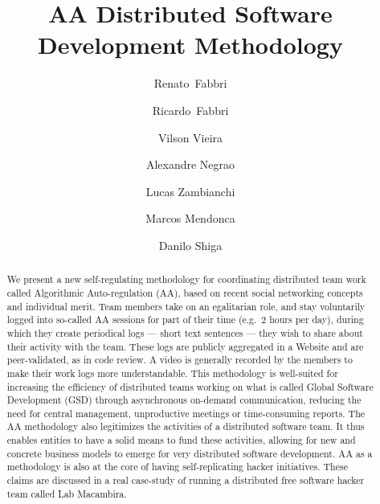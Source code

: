 \title{
AA Distributed Software Development Methodology
}

\author{%
Renato~Fabbri \and Ricardo~Fabbri \and Vilson Vieira \and Alexandre Negrao \and Lucas Zambianchi
\and Marcos Mendonca \and Danilo Shiga
}

\maketitle

\begin{abstract}
We present a new self-regulating methodology for coordinating
distributed team work called Algorithmic Auto-regulation (AA), based
on recent social networking concepts and individual merit. Team
members take on an egalitarian role, and stay voluntarily logged into
so-called AA sessions for part of their time (e.g.\ 2 hours per day),
during which they create periodical logs --- short text sentences ---
they wish to share about their activity with the team. These logs are
publicly aggregated in a Website and are peer-validated, as in code
review. A video is generally recorded by the members to make their
work logs more understandable. This methodology is well-suited for
increasing the efficiency of distributed teams working on what is
called Global Software Development (GSD) through asynchronous
on-demand communication, reducing the need for central management,
unproductive meetings or time-consuming reports. The AA methodology
also legitimizes the activities of a distributed software team.  It
thus enables entities to have a solid means to fund these activities,
allowing for new and concrete business models to emerge for very
distributed software development. AA as a methodology is also at the
core of having self-replicating hacker initiatives. These claims are
discussed in a real case-study of running a distributed free software
hacker team called Lab Macambira.
\end{abstract}

